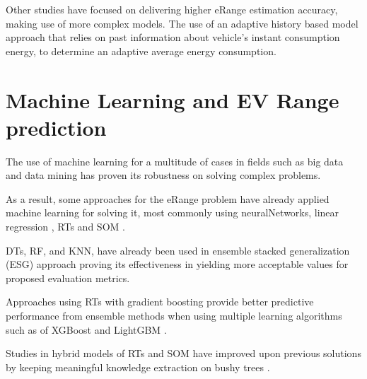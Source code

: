 Other studies have focused on delivering 
higher \gls{eRange} estimation accuracy,
making use of more complex models. 
The use of an adaptive history based model 
approach \citep{classicEVX} that relies on
past information about vehicle's instant 
consumption energy, to determine an
adaptive average energy consumption.

\section{Machine Learning and EV Range prediction}
\label{sec:stateOfArtML}

The use of machine learning for a multitude
of cases \citep{machineLearningCaseStudy} in fields such as 
big data \citep{machineLearningBigData, machineLearningBigData2}
and data mining \citep{businessDataMining} has 
proven its robustness on solving complex problems.

As a result, some approaches for the \gls{eRange}
problem have already applied machine learning 
for solving it, most commonly using \gls{neuralNetworks}, 
linear regression \citep{eRangeMachineLearningNeuralnetworkMLR},
\glspl{RT} and \gls{SOM} \citep{eRangeMachineLearningGHSOM}.

\glspl{DT}, \gls{RF}, and \gls{KNN}, have already been 
used in ensemble stacked generalization (ESG) approach 
\citep{eRangeMachineLearningEnsemble} proving its 
effectiveness in yielding more acceptable values
for proposed evaluation metrics.

Approaches using \glspl{RT} with gradient boosting 
provide better predictive performance from
ensemble methods when using multiple learning algorithms
such as of \gls{XGBoost} and \gls{LightGBM}
\citep{machineLearningERangeGradientBoostRts}.

Studies in hybrid models of \glspl{RT} and \gls{SOM} 
have improved upon previous solutions by
keeping meaningful knowledge extraction on bushy trees
\citep{machineLearningERangeSOMandRts}.

